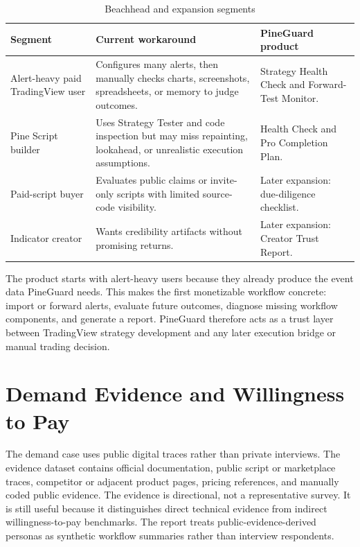\documentclass[11pt,a4paper]{article}
\begin{document}
\begin{table}[H]
\centering
\caption{Beachhead and expansion segments}
\begin{tabularx}{\textwidth}{>{\raggedright\arraybackslash}p{3.1cm}X>{\raggedright\arraybackslash}p{3.2cm}}
\toprule
\textbf{Segment} & \textbf{Current workaround} & \textbf{PineGuard product} \\
\midrule
Alert-heavy paid TradingView user & Configures many alerts, then manually checks charts, screenshots, spreadsheets, or memory to judge outcomes. & Strategy Health Check and Forward-Test Monitor. \\
Pine Script builder & Uses Strategy Tester and code inspection but may miss repainting, lookahead, or unrealistic execution assumptions. & Health Check and Pro Completion Plan. \\
Paid-script buyer & Evaluates public claims or invite-only scripts with limited source-code visibility. & Later expansion: due-diligence checklist. \\
Indicator creator & Wants credibility artifacts without promising returns. & Later expansion: Creator Trust Report. \\
\bottomrule
\end{tabularx}
\end{table}

The product starts with alert-heavy users because they already produce the event data PineGuard needs. This makes the first monetizable workflow concrete: import or forward alerts, evaluate future outcomes, diagnose missing workflow components, and generate a report. PineGuard therefore acts as a trust layer between TradingView strategy development and any later execution bridge or manual trading decision.

\section{Demand Evidence and Willingness to Pay}

The demand case uses public digital traces rather than private interviews. The evidence dataset contains official documentation, public script or marketplace traces, competitor or adjacent product pages, pricing references, and manually coded public evidence. The evidence is directional, not a representative survey. It is still useful because it distinguishes direct technical evidence from indirect willingness-to-pay benchmarks. The report treats public-evidence-derived personas as synthetic workflow summaries rather than interview respondents.
\end{document}

